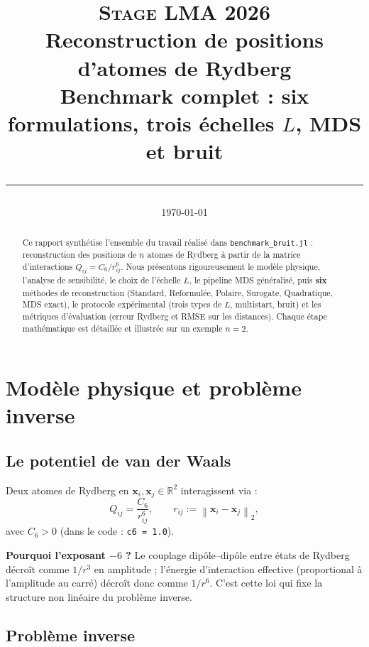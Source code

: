 \documentclass[12pt,a4paper]{article}
\title{%
  \vspace{-1cm}
  {\large\textcolor{bleu}{\textsc{Stage LMA 2026}}}\\[0.4cm]
  {\LARGE\bfseries Reconstruction de positions d'atomes de Rydberg}\\[0.3cm]
  {\large\textcolor{bleu!70!black}%
    {Benchmark complet : six formulations, trois échelles $L$, MDS et bruit}}\\[0.3cm]
  \rule{\linewidth}{0.5pt}
}
\author{}
\date{\today}
\newcommand{\R}{\mathbb{R}}
\newcommand{\norm}[1]{\left\|#1\right\|}
\begin{document}
\maketitle
\thispagestyle{fancy}

\begin{abstract}
\noindent
Ce rapport synthétise l'ensemble du travail réalisé dans
\texttt{benchmark\_bruit.jl} : reconstruction des positions de $n$ atomes
de Rydberg à partir de la matrice d'interactions $Q_{ij} = C_6/r_{ij}^6$.
Nous présentons rigoureusement le modèle physique, l'analyse de sensibilité,
le choix de l'échelle $L$, le pipeline MDS généralisé, puis \textbf{six}
méthodes de reconstruction (Standard, Reformulée, Polaire, Surogate,
Quadratique, MDS exact), le protocole expérimental (trois types de $L$,
multistart, bruit) et les métriques d'évaluation (erreur Rydberg et
RMSE sur les distances). Chaque étape mathématique est détaillée et
illustrée sur un exemple $n=2$.
\end{abstract}

\tableofcontents
\newpage

\section{Modèle physique et problème inverse}

\subsection{Le potentiel de van der Waals}

Deux atomes de Rydberg en $\mathbf{x}_i, \mathbf{x}_j \in \R^2$ interagissent via :
\begin{equation}\label{eq:rydberg}
  \boxed{Q_{ij} = \frac{C_6}{r_{ij}^6}}, \qquad
  r_{ij} := \norm{\mathbf{x}_i - \mathbf{x}_j}_2,
\end{equation}
avec $C_6 > 0$ (dans le code : \texttt{c6 = 1.0}).

\textbf{Pourquoi l'exposant $-6$ ?}
Le couplage dipôle--dipôle entre états de Rydberg décroît comme $1/r^3$ en amplitude ;
l'énergie d'interaction effective (proportional à l'amplitude au carré) décroît donc
comme $1/r^6$. C'est cette loi qui fixe la structure non linéaire du problème inverse.

\subsection{Problème inverse}
\end{document}
